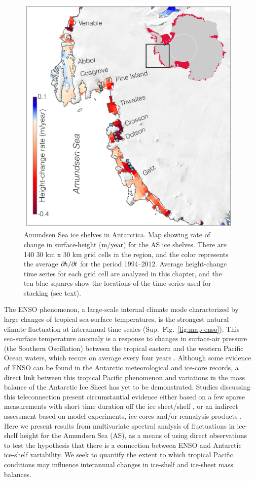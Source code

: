 \begin{figure}[!hb]
  \centering
  \includegraphics[width=.72\textwidth]{img/map_amundsen_v3.png}
  \caption[Amundsen Sea ice shelves in Antarctica]{
  \ssp \footnotesize
  Amundsen Sea ice shelves in Antarctica. Map showing rate of change in surface-height (m/year) for the AS ice shelves. There are 140 30 km x 30 km grid cells in the region, and the color represents the average $\partial\mkern-1.5mu h/\partial\mkern-1.5mu t$ for the period 1994--2012. Average height-change time series for each grid cell are analyzed in this chapter, and the ten blue squares show the locations of the time series used for stacking (see text).
  }
  \label{fig:map-amundsen}
\end{figure}


The ENSO phenomenon, a large-scale internal climate mode characterized by large changes of tropical sea-surface temperatures, is the strongest natural climate fluctuation at interannual time scales (Sup.~Fig.~\ref{fig:map-enso}). This sea-surface temperature anomaly is a response to changes in surface-air pressure (the Southern Oscillation) between the tropical eastern and the western Pacific Ocean waters, which recurs on average every four years \parencite{Latif2009, Philander1989}. Although some evidence of ENSO can be found in the Antarctic meteorological and ice-core records, a direct link between this tropical Pacific phenomenon and variations in the mass balance of the Antarctic Ice Sheet has yet to be demonstrated. Studies discussing this teleconnection present circumstantial evidence either based on a few sparse measurements with short time duration off the ice sheet/shelf \parencite[e.g.,][]{Dutrieux2014}, or an indirect assessment based on model experiments, ice cores and/or reanalysis products \parencite[e.g.,][]{Steig2013}. Here we present results from multivariate spectral analysis of fluctuations in ice-shelf height for the Amundsen Sea (AS), as a means of using direct observations to test the hypothesis that there is a connection between ENSO and Antarctic ice-shelf variability. We seek to quantify the extent to which tropical Pacific conditions may influence interannual changes in ice-shelf and ice-sheet mass balances.

